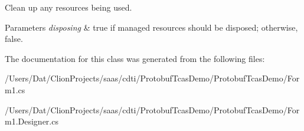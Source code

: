 Clean up any resources being used. 


\begin{DoxyParams}{Parameters}
{\em disposing} & true if managed resources should be disposed; otherwise, false.\\
\hline
\end{DoxyParams}


The documentation for this class was generated from the following files\+:\begin{DoxyCompactItemize}
\item 
/\+Users/\+Dat/\+Clion\+Projects/saas/cdti/\+Protobuf\+Tcas\+Demo/\+Protobuf\+Tcas\+Demo/Form1.\+cs\item 
/\+Users/\+Dat/\+Clion\+Projects/saas/cdti/\+Protobuf\+Tcas\+Demo/\+Protobuf\+Tcas\+Demo/Form1.\+Designer.\+cs\end{DoxyCompactItemize}
